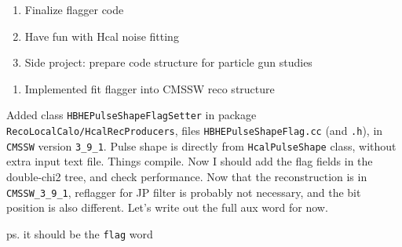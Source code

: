 

\begin{enumerate}
\item Finalize flagger code
\item Have fun with Hcal noise fitting
\item Side project: prepare code structure for particle gun studies
\end{enumerate}


\begin{enumerate}
\item Implemented fit flagger into CMSSW reco structure
\end{enumerate}


Added class \texttt{HBHEPulseShapeFlagSetter} in package \texttt{RecoLocalCalo/HcalRecProducers}, files \texttt{HBHEPulseShapeFlag.cc} (and \texttt{.h}), in \texttt{CMSSW} version \texttt{3\_9\_1}.
Pulse shape is directly from \texttt{HcalPulseShape} class, without extra input text file.
Things compile.  Now I should add the flag fields in the double-chi2 tree, and check performance.
Now that the reconstruction is in \texttt{CMSSW\_3\_9\_1}, reflagger for JP filter is probably not necessary, and the bit position is also different.
Let's write out the full aux word for now.

ps. it should be the \texttt{flag} word

